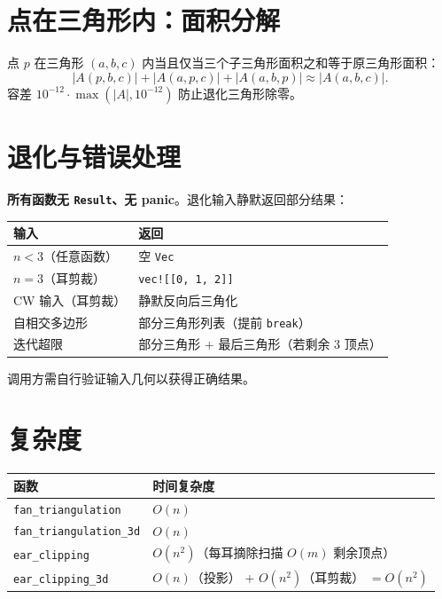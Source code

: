 \documentclass[11pt,a4paper]{article}
\begin{document}
\section{点在三角形内：面积分解}

点 $p$ 在三角形 $(a, b, c)$ 内当且仅当三个子三角形面积之和等于原三角形面积：
\[
  |A(p, b, c)| + |A(a, p, c)| + |A(a, b, p)| \approx |A(a, b, c)|.
\]
容差 $10^{-12} \cdot \max(|A|, 10^{-12})$ 防止退化三角形除零。

\section{退化与错误处理}

\textbf{所有函数无 \texttt{Result}、无 panic}。退化输入静默返回部分结果：

\begin{center}
\renewcommand{\arraystretch}{1.18}
\begin{tabular}{@{}ll@{}}
  \toprule
  \textbf{输入} & \textbf{返回} \\
  \midrule
  $n < 3$（任意函数） & 空 \texttt{Vec} \\
  $n = 3$（耳剪裁）   & \texttt{vec![[0, 1, 2]]} \\
  CW 输入（耳剪裁）   & 静默反向后三角化 \\
  自相交多边形         & 部分三角形列表（提前 \texttt{break}） \\
  迭代超限             & 部分三角形 + 最后三角形（若剩余 3 顶点） \\
  \bottomrule
\end{tabular}
\end{center}

调用方需自行验证输入几何以获得正确结果。

\section{复杂度}

\begin{center}
\renewcommand{\arraystretch}{1.18}
\begin{tabular}{@{}ll@{}}
  \toprule
  \textbf{函数} & \textbf{时间复杂度} \\
  \midrule
  \texttt{fan\_triangulation}     & $O(n)$ \\
  \texttt{fan\_triangulation\_3d} & $O(n)$ \\
  \texttt{ear\_clipping}          & $O(n^2)$（每耳摘除扫描 $O(m)$ 剩余顶点） \\
  \texttt{ear\_clipping\_3d}      & $O(n)$（投影） + $O(n^2)$（耳剪裁） $= O(n^2)$ \\
  \bottomrule
\end{tabular}
\end{center}
\end{document}
